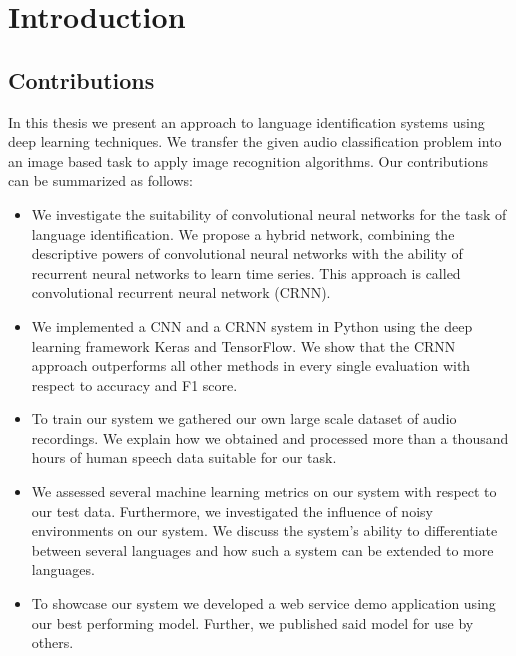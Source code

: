 \section{Introduction}




\subsection{Contributions}
In this thesis we present an approach to language identification systems using deep learning techniques. We transfer the given audio classification problem into an image based task to apply image recognition algorithms. Our contributions can be summarized as follows:
\begin{itemize}
	\item We investigate the suitability of convolutional neural networks for the task of language identification. We propose a hybrid network, combining the descriptive powers of convolutional neural networks with the ability of recurrent neural networks to learn time series. This approach is called convolutional recurrent neural network (CRNN). 
	\item We implemented a CNN and a CRNN system in Python using the deep learning framework Keras and TensorFlow. We show that the CRNN approach outperforms all other methods in every single evaluation with respect to accuracy and F1 score.
	\item To train our system we gathered our own large scale dataset of audio recordings. We explain how we obtained and processed more than a thousand hours of human speech data suitable for our task.
	\item We assessed several machine learning metrics on our system with respect to our test data. Furthermore, we investigated the influence of noisy environments on our system. We discuss the system's ability to differentiate between several languages and how such a system can be extended to more languages.
	\item To showcase our system we developed a web service demo application using our best performing model. Further, we published said model for use by others.
\end{itemize} 


